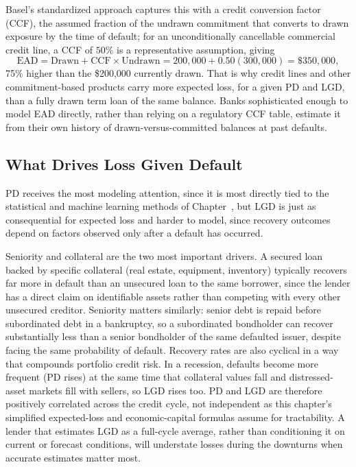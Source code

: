 \documentclass[../ai_in_finance]{subfiles}
\begin{document}
Basel's standardized approach captures this with a credit conversion factor (CCF), the assumed fraction of the undrawn commitment that converts to drawn exposure by the time of default; for an unconditionally cancellable commercial credit line, a CCF of $50\%$ is a representative assumption, giving
\begin{equation*}
\text{EAD} = \text{Drawn} + \text{CCF} \times \text{Undrawn} = 200{,}000 + 0.50(300{,}000) = \$350{,}000,
\end{equation*}
75\% higher than the \$200,000 currently drawn. That is why credit lines and other commitment-based products carry more expected loss, for a given PD and LGD, than a fully drawn term loan of the same balance. Banks sophisticated enough to model EAD directly, rather than relying on a regulatory CCF table, estimate it from their own history of drawn-versus-committed balances at past defaults.

\subsection{What Drives Loss Given Default}
\label{sec:lgd-drivers}

PD receives the most modeling attention, since it is most directly tied to the statistical and machine learning methods of Chapter~, but LGD is just as consequential for expected loss and harder to model, since recovery outcomes depend on factors observed only after a default has occurred.

Seniority and collateral are the two most important drivers. A secured loan backed by specific collateral (real estate, equipment, inventory) typically recovers far more in default than an unsecured loan to the same borrower, since the lender has a direct claim on identifiable assets rather than competing with every other unsecured creditor. Seniority matters similarly: senior debt is repaid before subordinated debt in a bankruptcy, so a subordinated bondholder can recover substantially less than a senior bondholder of the same defaulted issuer, despite facing the same probability of default.
Recovery rates are also cyclical in a way that compounds portfolio credit risk. In a recession, defaults become more frequent (PD rises) at the same time that collateral values fall and distressed-asset markets fill with sellers, so LGD rises too. PD and LGD are therefore positively correlated across the credit cycle, not independent as this chapter's simplified expected-loss and economic-capital formulas assume for tractability.
A lender that estimates LGD as a full-cycle average, rather than conditioning it on current or forecast conditions, will understate losses during the downturns when accurate estimates matter most.
\end{document}
